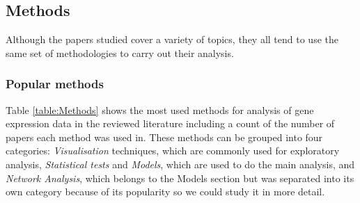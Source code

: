 \subsection{Methods}\label{Methods}

Although the papers studied cover a variety of topics, they all tend to use the same set of methodologies to carry out their analysis.

\subsubsection{Popular methods}
Table \ref{table:Methods} shows the most used methods for analysis of gene expression data in the reviewed literature including a count of the number of papers each method was used in. These methods can be grouped into four categories: \textit{Visualisation} techniques, which are commonly used for exploratory analysis, \textit{Statistical tests} and \textit{Models}, which are used to do the main analysis, and \textit{Network Analysis}, which belongs to the Models section but was separated into its own category because of its popularity so we could study it in more detail.

